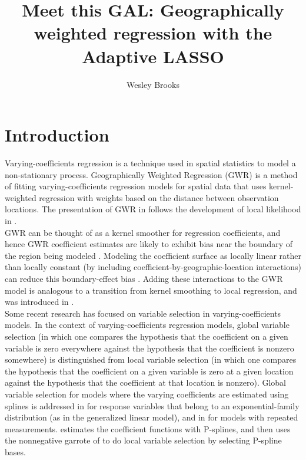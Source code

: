 \documentclass[authoryear, review, 11pt]{elsarticle}
\title{Meet this GAL: Geographically weighted regression with the Adaptive LASSO}
\author{Wesley Brooks}
\date{}                                           %
\begin{document}
\maketitle





\section{Introduction}
	Varying-coefficients regression \citep{Hastie:1993a} is a technique used in spatial statistics to model a non-stationary process. Geographically Weighted Regression (GWR) \citep{Fotheringham:2002} is a method of fitting varying-coefficients regression models for spatial data that uses kernel-weighted regression with weights based on the distance between observation locations. The presentation of GWR in \cite{Fotheringham:2002} follows the development of local likelihood in \cite{Loader:1999}.\\
	
	GWR can be thought of as a kernel smoother for regression coefficients, and hence GWR coefficient estimates are likely to exhibit bias near the boundary of the region being modeled \citep{Hastie:1993b}. Modeling the coefficient surface as locally linear rather than locally constant (by including coefficient-by-geographic-location interactions) can reduce this boundary-effect bias \citep{Hastie:1993b}. Adding these interactions to the GWR model is analogous to a transition from kernel smoothing to local regression, and was introduced in \cite{Wang:2008b}.\\
	
	Some recent research has focused on variable selection in varying-coefficients models. In the context of varying-coefficients regression models, global variable selection (in which one compares the hypothesis that the coefficient on a given variable is zero everywhere against the hypothesis that the coefficient is nonzero somewhere) is distinguished from local variable selection (in which one compares the hypothesis that the coefficient on a given variable is zero at a given location against the hypothesis that the coefficient at that location is nonzero). Global variable selection for models where the varying coefficients are estimated using splines is addressed in \cite{Fan:1999} for response variables that belong to an exponential-family distribution (as in the generalized linear model), and in \cite{Wang:2008a} for models with repeated measurements. \cite{Antoniadis:2012a} estimates the coefficient functions with P-splines, and then uses the nonnegative garrote of \cite{Breiman:1995} to do local variable selection by selecting P-spline bases.\\
	
\end{document}

